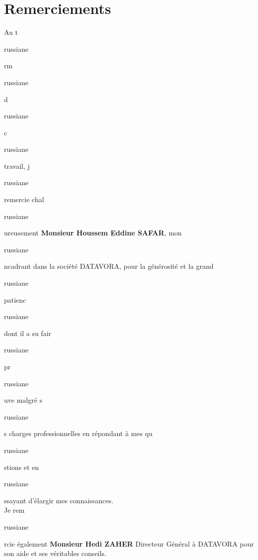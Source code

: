 \chapter*{\huge Remerciements}
Au t\begin{otherlanguage*}{russian}{e}\end{otherlanguage*}rm\begin{otherlanguage*}{russian}{e}\end{otherlanguage*} d\begin{otherlanguage*}{russian}{e}\end{otherlanguage*} c\begin{otherlanguage*}{russian}{e}\end{otherlanguage*} travail, j\begin{otherlanguage*}{russian}{e}\end{otherlanguage*} remercie chal\begin{otherlanguage*}{russian}{e}\end{otherlanguage*}ureusement \textbf{Monsieur Houssem Eddine SAFAR},
mon \begin{otherlanguage*}{russian}{e}\end{otherlanguage*}ncadrant dans la société DATAVORA, pour la générosité et la grand\begin{otherlanguage*}{russian}{e}\end{otherlanguage*}
patienc\begin{otherlanguage*}{russian}{e}\end{otherlanguage*} dont il a su fair\begin{otherlanguage*}{russian}{e}\end{otherlanguage*} pr\begin{otherlanguage*}{russian}{e}\end{otherlanguage*}uve malgré s\begin{otherlanguage*}{russian}{e}\end{otherlanguage*}s charges professionnelles en
répondant à  mes qu\begin{otherlanguage*}{russian}{e}\end{otherlanguage*}stions et en \begin{otherlanguage*}{russian}{e}\end{otherlanguage*}ssayant d’élargir mes connaissances.\\ 

Je rem\begin{otherlanguage*}{russian}{e}\end{otherlanguage*}rcie également \textbf{Monsieur Hedi ZAHER} Directeur Général à DATAVORA pour son aide et ses véritables conseils.\\


